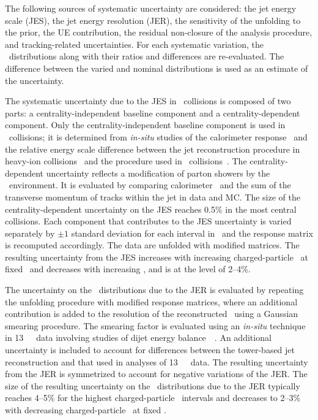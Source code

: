 
The following sources of systematic uncertainty are considered:
the jet energy scale (JES), the jet energy resolution (JER), 
the sensitivity of the  unfolding to the prior, the UE contribution, the residual non-closure of the analysis procedure, and tracking-related uncertainties.
For each systematic variation, the \Dptr\ distributions along with their ratios and differences are re-evaluated. The difference between the varied and nominal distributions is used as an estimate of the uncertainty.

The systematic uncertainty due to the JES in \PbPb\ collisions is composed of two parts: 
a centrality-independent baseline component and a centrality-dependent component. Only the centrality-independent baseline component is used in \pp\ collisions; 
it is determined from \textit{in-situ} studies of the calorimeter
response~\cite{Aad:2011he,HIjesnote,Aaboud:2017jcu} and the relative energy scale difference between the jet reconstruction procedure in heavy-ion collisions~\cite{HIjesnote} and the procedure used in \pp\ collisions~\cite{Aad:2014bia}. The centrality-dependent uncertainty reflects a modification of parton showers by the \PbPb\ environment. It is evaluated by comparing calorimeter \ptjet\ and the sum of the transverse momentum of tracks within the jet in data and MC. The size of the centrality-dependent uncertainty on the JES reaches 0.5\% in the most central collisions. Each component that contributes to the JES uncertainty is varied separately by $\pm1$ standard deviation for each interval in \ptjet\ and the response matrix is recomputed accordingly. The data are unfolded with modified matrices. The resulting uncertainty from the JES increases with increasing charged-particle \pT\ at fixed \ptjet\ and decreases with increasing \ptjet, and is at the level of 2--4\%.

The uncertainty on the \Dptr\ distributions due to the JER is evaluated by repeating the unfolding procedure with modified response matrices, where an additional contribution is added to the resolution of the reconstructed \ptjet\ using a Gaussian smearing procedure. The smearing factor is evaluated using an \textit{in-situ} technique in 13~\TeV\ \pp\ data involving studies of dijet energy balance~~\cite{Aad:2012ag,JERConfNote}. An additional uncertainty is included to account for differences between the tower-based jet reconstruction and that used in analyses of 13~\TeV\ \pp\ data. The resulting uncertainty from the JER is symmetrized to account for negative variations of the JER.  The size of the resulting uncertainty on the \Dptr\ distributions due to the JER typically reaches 4--5\% for the highest charged-particle \pT\ intervals and decreases to 2--3\% with decreasing charged-particle \pT\ at fixed \ptjet.

